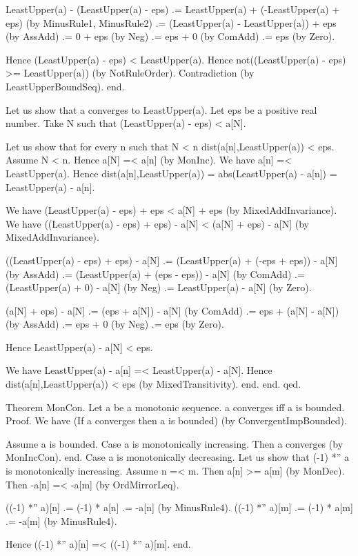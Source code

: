 \documentclass{article}
\newenvironment{forthel}{\begin{leftbar}}{\end{leftbar}}
\begin{document}
\begin{forthel}
	LeastUpper(a) - (LeastUpper(a) - eps) .= LeastUpper(a) + (-LeastUpper(a) + eps) (by MinusRule1, MinusRule2)
	.= (LeastUpper(a) - LeastUpper(a)) + eps (by AssAdd)
	.= 0 + eps (by Neg)
	.= eps + 0 (by ComAdd)
	.= eps (by Zero).
	
	Hence (LeastUpper(a) - eps) < LeastUpper(a).
	Hence not((LeastUpper(a) - eps) >= LeastUpper(a)) (by NotRuleOrder).
	Contradiction (by LeastUpperBoundSeq).
	end.
	
	Let us show that a converges to LeastUpper(a).
	Let eps be a positive real number.
	Take N such that (LeastUpper(a) - eps) < a[N].
	
	Let us show that for every n such that N < n dist(a[n],LeastUpper(a)) < eps.
	Assume N < n.
	Hence a[N] =< a[n] (by MonInc).
	We have a[n] =< LeastUpper(a).
	Hence dist(a[n],LeastUpper(a)) = abs(LeastUpper(a) - a[n]) = LeastUpper(a) - a[n].
	
	We have (LeastUpper(a) - eps) + eps < a[N] + eps (by MixedAddInvariance).
	We have ((LeastUpper(a) - eps) + eps) - a[N] < (a[N] + eps) - a[N] (by MixedAddInvariance).
	
	((LeastUpper(a) - eps) + eps) - a[N] .= (LeastUpper(a) + (-eps + eps)) - a[N] (by AssAdd)
	.= (LeastUpper(a) + (eps - eps)) - a[N] (by ComAdd)
	.= (LeastUpper(a) + 0) - a[N] (by Neg)
	.= LeastUpper(a) - a[N] (by Zero).
	
	(a[N] + eps) - a[N] .= (eps + a[N]) - a[N] (by ComAdd)
	.= eps + (a[N] - a[N]) (by AssAdd)
	.= eps + 0 (by Neg)
	.= eps (by Zero).
	
	Hence LeastUpper(a) - a[N] < eps.
	
	We have LeastUpper(a) - a[n] =< LeastUpper(a) - a[N].
	Hence dist(a[n],LeastUpper(a)) < eps (by MixedTransitivity).
	end.
	end.
	qed.
	
	Theorem MonCon.
	Let a be a monotonic sequence. a converges iff a is bounded.
	Proof.
	We have (If a converges then a is bounded) (by ConvergentImpBounded).
	
	Assume a is bounded.
	Case a is monotonically increasing.
	Then a converges (by MonIncCon). 
	end.
	Case a is monotonically decreasing.
	Let us show that (-1) *'' a is monotonically increasing.
	Assume n =< m.
	Then a[n] >= a[m] (by MonDec).
	Then -a[n] =< -a[m] (by OrdMirrorLeq).
	
	((-1) *'' a)[n] .= (-1) * a[n]
	.= -a[n] (by MinusRule4).
	((-1) *'' a)[m] .= (-1) * a[m]
	.= -a[m] (by MinusRule4).
	
	Hence ((-1) *'' a)[n] =< ((-1) *'' a)[m].
	end.
	

\end{forthel}
\end{document}
